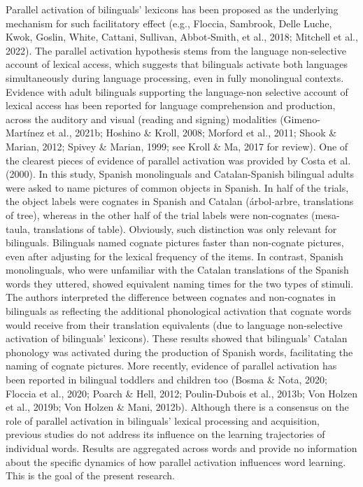 \documentclass[
  12pt,
  b5paperpaper,
  twoside]{scrreprt}
\begin{document}
Parallel activation of bilinguals' lexicons has been proposed as the
underlying mechanism for such facilitatory effect (e.g., Floccia,
Sambrook, Delle Luche, Kwok, Goslin, White, Cattani, Sullivan,
Abbot‐Smith, et al., 2018; Mitchell et al., 2022). The parallel
activation hypothesis stems from the language non-selective account of
lexical access, which suggests that bilinguals activate both languages
simultaneously during language processing, even in fully monolingual
contexts. Evidence with adult bilinguals supporting the language-non
selective account of lexical access has been reported for language
comprehension and production, across the auditory and visual (reading
and signing) modalities (Gimeno-Martínez et al., 2021b; Hoshino \&
Kroll, 2008; Morford et al., 2011; Shook \& Marian, 2012; Spivey \&
Marian, 1999; see Kroll \& Ma, 2017 for review). One of the clearest
pieces of evidence of parallel activation was provided by Costa et al.
(2000). In this study, Spanish monolinguals and Catalan-Spanish
bilingual adults were asked to name pictures of common objects in
Spanish. In half of the trials, the object labels were cognates in
Spanish and Catalan (árbol-arbre, translations of tree), whereas in the
other half of the trial labels were non-cognates (mesa-taula,
translations of table). Obviously, such distinction was only relevant
for bilinguals. Bilinguals named cognate pictures faster than
non-cognate pictures, even after adjusting for the lexical frequency of
the items. In contrast, Spanish monolinguals, who were unfamiliar with
the Catalan translations of the Spanish words they uttered, showed
equivalent naming times for the two types of stimuli. The authors
interpreted the difference between cognates and non-cognates in
bilinguals as reflecting the additional phonological activation that
cognate words would receive from their translation equivalents (due to
language non-selective activation of bilinguals' lexicons). These
results showed that bilinguals' Catalan phonology was activated during
the production of Spanish words, facilitating the naming of cognate
pictures. More recently, evidence of parallel activation has been
reported in bilingual toddlers and children too (Bosma \& Nota, 2020;
Floccia et al., 2020; Poarch \& Hell, 2012; Poulin-Dubois et al., 2013b;
Von Holzen et al., 2019b; Von Holzen \& Mani, 2012b). Although there is
a consensus on the role of parallel activation in bilinguals' lexical
processing and acquisition, previous studies do not address its
influence on the learning trajectories of individual words. Results are
aggregated across words and provide no information about the specific
dynamics of how parallel activation influences word learning. This is
the goal of the present research.
\end{document}
